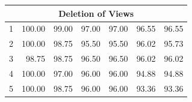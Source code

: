 \begin{table}[t]
\begin{tabular}{l r l r l r l}
		\multicolumn{7}{c}{\textbf{Deletion of Views}} \\ \hline
		1 & 100.00 \hspace{0.5cm} & 99.00 & 97.00 \hspace{0.5cm} & 97.00 & 96.55 \hspace{0.5cm} & 96.55 \\ 
		2 & 100.00 \hspace{0.5cm} & 98.75 & 95.50 \hspace{0.5cm} & 95.50 & 96.02 \hspace{0.5cm} & 95.73 \\ 
		3 &  98.75 \hspace{0.5cm} & 98.75 & 96.50 \hspace{0.5cm} & 96.50 & 96.02 \hspace{0.5cm} & 96.02 \\ 
		4 & 100.00 \hspace{0.5cm} & 97.00 & 96.00 \hspace{0.5cm} & 96.00 & 94.88 \hspace{0.5cm} & 94.88 \\ 
		5 & 100.00 \hspace{0.5cm} & 98.75 & 96.00 \hspace{0.5cm} & 96.00 & 93.36 \hspace{0.5cm} & 93.36 \\ \hline
	
	\end{tabular}
\end{table}

